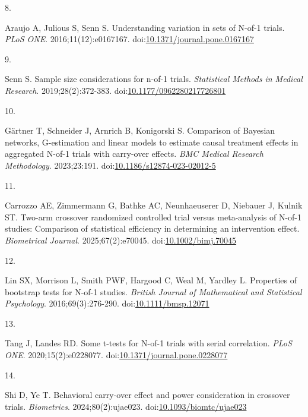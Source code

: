 \documentclass[
  11pt,
]{article}
\newlength{\cslhangindent}
\newlength{\csllabelwidth}
\newenvironment{CSLReferences}[2] %
 {\begin{list}{}{%
  \setlength{\itemindent}{0pt}
  \setlength{\leftmargin}{0pt}
  \setlength{\parsep}{0pt}
  \ifodd #1
   \setlength{\leftmargin}{\cslhangindent}
   \setlength{\itemindent}{-1\cslhangindent}
  \fi
  \setlength{\itemsep}{#2\baselineskip}}}
 {\end{list}}
\newcommand{\CSLLeftMargin}[1]{\parbox[t]{\csllabelwidth}{\strut#1\strut}}
\newcommand{\CSLRightInline}[1]{\parbox[t]{\linewidth - \csllabelwidth}{\strut#1\strut}}
\begin{document}
\begin{CSLReferences}{0}{1}
\CSLLeftMargin{8. }%
\CSLRightInline{Araujo A, Julious S, Senn S. Understanding variation in sets of {N}-of-1 trials. \emph{PLoS ONE}. 2016;11(12):e0167167. doi:\href{https://doi.org/10.1371/journal.pone.0167167}{10.1371/journal.pone.0167167}}

\CSLLeftMargin{9. }%
\CSLRightInline{Senn S. Sample size considerations for n-of-1 trials. \emph{Statistical Methods in Medical Research}. 2019;28(2):372-383. doi:\href{https://doi.org/10.1177/0962280217726801}{10.1177/0962280217726801}}

\CSLLeftMargin{10. }%
\CSLRightInline{Gärtner T, Schneider J, Arnrich B, Konigorski S. Comparison of {B}ayesian networks, {G}-estimation and linear models to estimate causal treatment effects in aggregated {N}-of-1 trials with carry-over effects. \emph{BMC Medical Research Methodology}. 2023;23:191. doi:\href{https://doi.org/10.1186/s12874-023-02012-5}{10.1186/s12874-023-02012-5}}

\CSLLeftMargin{11. }%
\CSLRightInline{Carrozzo AE, Zimmermann G, Bathke AC, Neunhaeuserer D, Niebauer J, Kulnik ST. Two-arm crossover randomized controlled trial versus meta-analysis of {N}-of-1 studies: Comparison of statistical efficiency in determining an intervention effect. \emph{Biometrical Journal}. 2025;67(2):e70045. doi:\href{https://doi.org/10.1002/bimj.70045}{10.1002/bimj.70045}}

\CSLLeftMargin{12. }%
\CSLRightInline{Lin SX, Morrison L, Smith PWF, Hargood C, Weal M, Yardley L. Properties of bootstrap tests for {N}-of-1 studies. \emph{British Journal of Mathematical and Statistical Psychology}. 2016;69(3):276-290. doi:\href{https://doi.org/10.1111/bmsp.12071}{10.1111/bmsp.12071}}

\CSLLeftMargin{13. }%
\CSLRightInline{Tang J, Landes RD. Some t-tests for {N}-of-1 trials with serial correlation. \emph{PLoS ONE}. 2020;15(2):e0228077. doi:\href{https://doi.org/10.1371/journal.pone.0228077}{10.1371/journal.pone.0228077}}

\CSLLeftMargin{14. }%
\CSLRightInline{Shi D, Ye T. Behavioral carry-over effect and power consideration in crossover trials. \emph{Biometrics}. 2024;80(2):ujae023. doi:\href{https://doi.org/10.1093/biomtc/ujae023}{10.1093/biomtc/ujae023}}


\end{CSLReferences}
\end{document}

